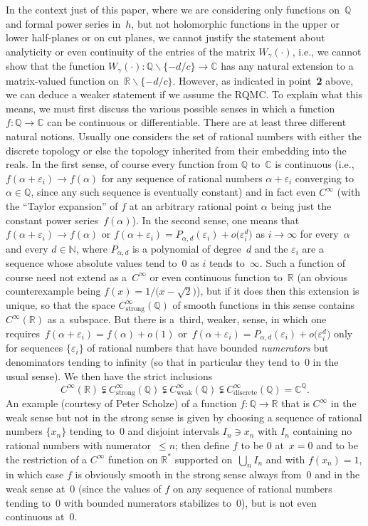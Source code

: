 \documentclass[pdftex]{sigma}
\numberwithin{equation}{section}
\def\a{\alpha}
\def\R{\mathbb R}
\def\C{\mathbb C}
\def\N{\mathbb N}
\def\Q{\mathbb Q}
\def\a{\alpha}
\def\v{\varepsilon}
\def\ssm{\smallsetminus}
\def\g{\gamma}
\begin{document}
In the context just of this paper, where we are considering only functions
on~$\Q$ and formal power series in~$h$, but not holomorphic functions in the
upper or lower half-planes or on cut planes, we cannot justify the statement
about analyticity or even continuity of the entries of the matrix $W_\g(\cdot)$, i.e.,
we cannot show that the function $W_\g(\cdot)\colon \Q\ssm\{-d/c\}\to\C$ has
any natural extension to a matrix-valued function on~$\R\ssm\{-d/c\}$.
However, as indicated in point~{\bf 2} above, we can deduce a weaker statement
if we assume the RQMC. To explain what this means, we must first discuss the various
possible senses in which a function $f\colon\Q\to\C$ can be continuous or differentiable.
There are at least three different natural notions. Usually one considers the set
of rational numbers with either the discrete topology or else the topology inherited
from their embedding into the reals. In the first sense, of course every
function from $\Q$ to~$\C$ is continuous (i.e., $f(\a+\v_i)\to f(\a)$ for any
sequence of rational numbers $\a+\v_i$ converging to $\a\in\Q$, since any such sequence
is eventually constant) and in fact even $C^\infty$ (with the ``Taylor expansion''
of $f$ at an arbitrary rational point $\a$ being just the constant power series~$f(\a)$).
In the second sense, one means that $f(\a+\v_i)\to f(\a)$ or
$f(\a+\v_i)=P_{\a,d}(\v_i)+o\big(\v_i^d\big)$ as $i\to\infty$ for every~$\a$ and
every $d\in\N$, where $P_{\a,d}$ is a polynomial of degree~$d$ and the $\v_i$
are a sequence whose absolute values tend to~0 as $i$ tends to~$\infty$. Such
a function of course need not extend as a~$C^\infty$ or even continuous
function to~$\R$ \big(an obvious counterexample being $f(x)=1/\big(x-\sqrt2\big)$\big),
but if it does then this extension is unique, so that the space
$C^\infty_{\text{strong}}(\Q)$ of smooth functions in
this sense contains $C^\infty(\R)$ as a~subspace. But there is a~third, weaker, sense, in
which one requires~${f(\a+\v_i)=f(\a)+o(1)}$ or~${f(\a+\v_i)=P_{\a,d}(\v_i)
+o\big(\v_i^d\big)}$ only for sequences $\{\v_i\}$ of rational numbers that have bounded
\emph{numerators} but denominators tending to infinity (so that in particular they tend
to~0 in the usual sense). We then have the strict inclusions
\[
C^\infty(\R)\subsetneqq C^\infty_{\text{strong}}(\Q) \subsetneqq
C^\infty_{\text{weak}}(\Q)\subsetneqq C^\infty_{\text{discrete}}(\Q) = \C^\Q .
\]
An example (courtesy of Peter Scholze) of a function $f\colon\Q\to\R$ that is $C^\infty$ in
the weak sense but not in the strong sense is given by choosing a sequence of rational
numbers $\{x_n\}$ tending to~0 and disjoint intervals $I_n\ni x_n$ with $I_n$ containing
no rational numbers with numerator~$\le n$; then define $f$ to be 0 at~$x=0$ and to be
the restriction of a $C^\infty$ function on $\R^*$ supported on~$\bigcup_nI_n$ and with
$f(x_n)=1$, in which case $f$ is obviously smooth in the strong sense always from~0 and
in the weak sense at~0 (since the values of $f$ on any sequence of rational numbers
tending to~0 with bounded numerators stabilizes to~0), but is not even continuous at~0.
\end{document}
